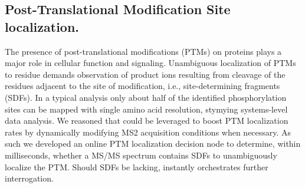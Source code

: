 \subsection*{Post-Translational Modification Site localization.}

The presence of post-translational modifications (PTMs) on proteins plays a major role in cellular function and signaling. Unambiguous localization of PTMs to residue demands observation of product ions resulting from cleavage of the residues adjacent to the site of modification, i.e., site-determining fragments (SDFs). In a typical analysis only about half of the identified phosphorylation sites can be mapped with single amino acid resolution, stymying systems-level data analysis. We reasoned that \inseq{} could be leveraged to boost PTM localization rates by dynamically modifying MS2 acquisition conditions when necessary. As such we developed an online PTM localization decision node to determine, within milliseconds, whether a MS/MS spectrum contains SDFs to unambiguously localize the PTM. Should SDFs be lacking, \inseq{} instantly orchestrates further interrogation.

